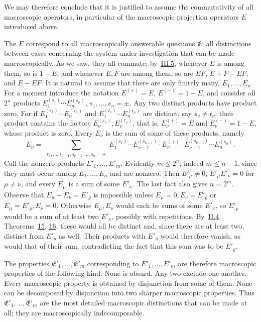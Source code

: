 \documentclass[fontsize=13pt,twoside,openany,headings=normal,parskip=false,bookmarkpackage=false,DIV=calc]{scrbook}
\begin{document}
We may therefore conclude that it is justified to assume the commutativity of all macroscopic operators, in particular of the macroscopic projection operators $E$ introduced above.

The $E$ correspond to all macroscopically answerable questions $\mathfrak E$: all distinctions between cases concerning the system under investigation that can be made macroscopically. As we saw, they all commute; by~\hyperref[sec:III.5]{III.5}, whenever $E$ is among them, so is $1-E$, and whenever $E,F$ are among them, so are $EF$, $E+F-EF$, and $E-EF$. It is natural to assume that there are only finitely many, $E_1,\ldots,E_n$. For a moment introduce the notation $E^{(+)}=E$, $E^{(-)}=1-E$, and consider all $2^n$ products $E_1^{(s_1)}\cdots E_n^{(s_n)}$, $s_1,\ldots,s_n=\pm$. Any two distinct products have product zero. For if $E_1^{(s_1)}\cdots E_n^{(s_n)}$ and $E_1^{(t_1)}\cdots E_n^{(t_n)}$ are distinct, say $s_\nu\ne t_\nu$, their product contains the factors $E_\nu^{(s_\nu)},E_\nu^{(t_\nu)}$, that is, $E_\nu^{(+)}=E$
\hypertarget{origpage-218}{}%
and $E_\nu^{(-)}=1-E$, whose product is zero. Every $E_\nu$ is the sum of some of these products, namely
\[
E_\nu=\sum_{\substack{s_1,\ldots,s_{\nu-1},s_{\nu+1},\ldots,s_n=\pm}}
 E_1^{(s_1)}\cdots E_{\nu-1}^{(s_{\nu-1})}\cdot E_\nu^{(+)}\cdot E_{\nu+1}^{(s_{\nu+1})}\cdots E_n^{(s_n)}.
\]
Call the nonzero products $E'_1,\ldots,E'_m$. Evidently $m\leq2^n$; indeed $m\leq n-1$, since they must occur among $E_1,\ldots,E_n$ and are nonzero. Then $E'_\mu\ne0$, $E'_\mu E'_\nu=0$ for $\mu\ne\nu$, and every $E_\mu$ is a sum of some $E'_\kappa$. The last fact also gives $n=2^m$. Observe that $E_\mu+E_\nu=E'_\varrho$ is impossible unless $E_\mu=0,E_\nu=E'_\varrho$ or $E_\mu=E'_\varrho,E_\nu=0$. Otherwise $E_\mu,E_\nu$ would each be sums of some $E'_\kappa$, so $E'_\varrho$ would be a sum of at least two $E'_\kappa$, possibly with repetitions. By~\hyperref[sec:II.4]{II.4}, Theorems~\hyperref[thm:II.15]{15}, \hyperref[thm:II.16]{16}, these would all be distinct and, since there are at least two, distinct from $E'_\varrho$ as well. Their products with $E'_\varrho$ would therefore vanish, as would that of their sum, contradicting the fact that this sum was to be $E'_\varrho$.

The properties $\mathfrak E'_1,\ldots,\mathfrak E'_m$ corresponding to $E'_1,\ldots,E'_m$ are therefore macroscopic properties of the following kind. None is absurd. Any two exclude one another. Every macroscopic property is obtained by disjunction from some of them. None can be decomposed by disjunction into two sharper macroscopic properties. Thus $\mathfrak E'_1,\ldots,\mathfrak E'_m$ are the most detailed macroscopic distinctions that can be made at all; they are macroscopically indecomposable.
\end{document}
